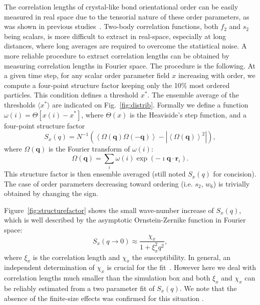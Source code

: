\documentclass[twocolumn,superscriptaddress]{revtex4}
\begin{document}
The correlation lengths of crystal-like bond orientational order can be easily measured in real space due to the tensorial nature
of these order parameters, as was shown in previous studies~\cite{tanaka,kawasaki,mathieu_icosahedra,russo_gcm,russo_hs}. Two-body
correlation functions, both $f_2$ and $s_2$ being scalars, is more difficult to extract in real-space, especially at long distances,
where long averages are required to overcome the statistical noise. A more reliable procedure to extract correlation lengths can
be obtained by measuring correlation lengths in Fourier space.
The procedure is the following.
At a given time step, for any scalar order parameter field $x$ increasing with order, we compute a four-point structure factor keeping only the 10\% most ordered particles. This condition defines a threshold $x^*$. The ensemble average of the thresholds $\langle x^*\rangle$ are indicated on Fig.~\ref{fig:distrib}. Formally we define a function $\omega(i) = \Theta [x(i) - x^*]$, where $\Theta(x)$ is the Heaviside’s step function, and a four-point structure factor
\begin{equation}
	S_x(q) = N^{-1}(\left\langle \Omega(\mathbf{q}) \Omega(-\mathbf{q}) \right\rangle - | \left\langle \Omega(\mathbf{q}) \right\rangle^2 |),   
	\label{eq:StrutureFactor}
\end{equation}
where $\Omega(\mathbf{q})$ is the Fourier transform of $\omega(i)$: 
\begin{equation}
	\Omega(\mathbf{q}) = \sum_i \omega(i)\exp(-\imath \mathbf{q}\cdot\mathbf{r}_i).  
\end{equation}
This structure factor is then ensemble averaged (still noted $S_x(q)$ for concision). The case of order parameters decreasing toward ordering (i.e. $s_2$, $w_6$) is trivially obtained by changing the sign.

Figure~\ref{fig:structurefactor} shows the small wave-number increase of $S_x(q)$, which is well described by the asymptotic Ornstein-Zernike function in Fourier space:
\begin{equation}
	S_x(q\rightarrow 0) \approx \frac{\chi_x}{1+\xi_x^2 q^2},
	\label{eq:OZ_Fourier}
\end{equation}
where $\xi_x$ is the correlation length and $\chi_x$ the susceptibility. In general, an independent determination of $\chi_x$ is crucial for the fit~\cite{Flenner2011}. However here we deal with correlation lengths much smaller than the simulation box and both $\xi_x$ and $\chi_x$ can be reliably estimated from a two parameter fit of $S_x(q)$. 
We note that the absence of the finite-size effects was confirmed for this situation \cite{tanaka}.  
\end{document}

